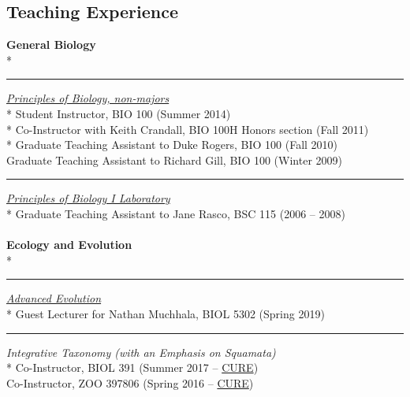 \documentclass[margin,line]{res}
\begin{document}
\begin{resume}

\section{\sc Teaching Experience}
\textbf{General Biology}\\*
\rule{-1mm}{5mm} \hspace*{4mm} \href{http://catalog.byu.edu/life-sciences/biology/principles-of-biology}{\textit{Principles of Biology, non-majors}}\\*
\hspace*{8mm} Student Instructor, BIO 100 (Summer 2014)\\*
\hspace*{8mm} Co-Instructor with Keith Crandall, BIO 100H Honors section (Fall 2011)\\*
\hspace*{8mm} Graduate Teaching Assistant to Duke Rogers, BIO 100 (Fall 2010)\\
\hspace*{8mm} Graduate Teaching Assistant to Richard Gill, BIO 100 (Winter 2009)\\
\rule{-1mm}{5mm} \hspace*{4mm} \href{http://catalog.byu.edu/life-sciences/biology/principles-of-biology}{\textit{Principles of Biology I Laboratory}}\\*
\hspace*{8mm} Graduate Teaching Assistant to Jane Rasco, BSC 115 (2006 -- 2008)\\
~\\
\textbf{Ecology and Evolution}\\*
\rule{-1mm}{5mm} \hspace*{4mm} \href{http://bulletin.umsl.edu/coursesofinstruction/biol/}{\textit{Advanced Evolution}}\\*
\hspace*{8mm} Guest Lecturer for Nathan Muchhala, BIOL 5302 (Spring 2019)\\
\rule{-1mm}{5mm} \hspace*{4mm} {\textit{Integrative Taxonomy (with an Emphasis on Squamata)}}\\*
\hspace*{8mm} Co-Instructor, BIOL 391 (Summer 2017 -- \href{https://sites.nationalacademies.org/cs/groups/dbassesite/documents/webpage/dbasse_177288.pdf}{CURE})\\
\hspace*{8mm} Co-Instructor, ZOO 397806 (Spring 2016 -- \href{https://sites.nationalacademies.org/cs/groups/dbassesite/documents/webpage/dbasse_177288.pdf}{CURE})\\

\end{resume}
\end{document}

